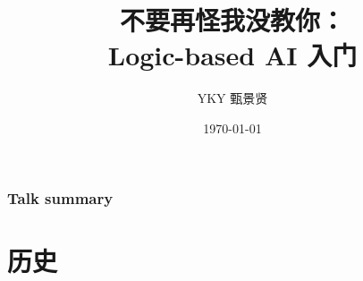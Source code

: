 \documentclass[17pt]{beamer}
\title[Logic AI]{{\normalsize 不要再怪我没教你：}\\ Logic-based AI 入门} %
\author{YKY 甄景贤} %
\institute[] %
{
Independent researcher, Hong Kong \\ %
\medskip
\textit{generic.intelligence@gmail.com} %
}
\date{\today} %
\begin{document}
\frame{\titlepage}

\begin{frame}
\frametitle{Talk summary}
\tableofcontents
\end{frame}

%
%





\section[Section]{历史}
\frame{\sectionpage}
\end{document}
